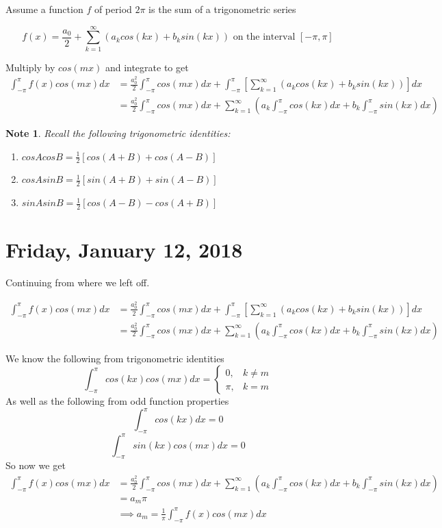 \documentclass[12pt]{article}
\theoremstyle{plain}
\newtheorem*{note}{Note}
\theoremstyle{definition}
\begin{document}
Assume a function $f$ of period $2\pi$ is the sum of a trigonometric series

$$f(x) = \frac{a_0}{2}+ \sum^\infty_{k=1} (a_k cos(kx) + b_k sin(kx)) \text{ on the interval } [-\pi,\pi]$$

Multiply by $cos(mx)$ and integrate to get
\begin{align*}
    \int^\pi_{-\pi} f(x)cos(mx) dx &= \frac{a_0^2}{2} \int^\pi_{-\pi} cos(mx) dx + \int^\pi_{-\pi} [\sum^\infty_{k=1} (a_k cos(kx) + b_k sin(kx))]dx\\
    &= \frac{a_0^2}{2} \int^\pi_{-\pi} cos(mx) dx +  \sum^\infty_{k=1} (a_k \int^\pi_{-\pi}cos(kx)dx + b_k \int^\pi_{-\pi}sin(kx)dx)
\end{align*}

\begin{note}
    Recall the following trigonometric identities:
    \begin{enumerate}
        \item $cosAcosB = \frac{1}{2} [cos(A+B) + cos(A-B)]$
        \item $cosAsinB = \frac{1}{2} [sin(A+B) + sin(A-B)]$
        \item $sinAsinB = \frac{1}{2} [cos(A-B) - cos(A+B)]$
    \end{enumerate}
\end{note}

\newpage

\section{Friday, January 12, 2018}

Continuing from where we left off.

\begin{align*}
    \int^\pi_{-\pi} f(x)cos(mx) dx &= \frac{a_0^2}{2} \int^\pi_{-\pi} cos(mx) dx + \int^\pi_{-\pi} [\sum^\infty_{k=1} (a_k cos(kx) + b_k sin(kx))]dx\\
    &= \frac{a_0^2}{2} \int^\pi_{-\pi} cos(mx) dx +  \sum^\infty_{k=1} (a_k \int^\pi_{-\pi}cos(kx)dx + b_k \int^\pi_{-\pi}sin(kx)dx)
\end{align*}

We know the following from trigonometric identities
$$\int^\pi_{-\pi} cos(kx)cos(mx) dx = \begin{cases}
    0, &k\neq m\\
    \pi, &k=m
\end{cases}$$
As well as the following from odd function properties
$$\int^\pi_{-\pi} cos(kx) dx = 0$$
$$\int^\pi_{-\pi} sin(kx)cos(mx) dx = 0$$
So now we get
\begin{align*}
    \int^\pi_{-\pi} f(x)cos(mx) dx
    &=  \frac{a_0^2}{2} \int^\pi_{-\pi} cos(mx) dx +  \sum^\infty_{k=1} (a_k \int^\pi_{-\pi}cos(kx)dx + b_k \int^\pi_{-\pi}sin(kx)dx)\\
    &= a_m \pi\\
    &\implies a_m = \frac{1}{\pi} \int^\pi_{-\pi} f(x)cos(mx) dx
\end{align*}
\end{document}
